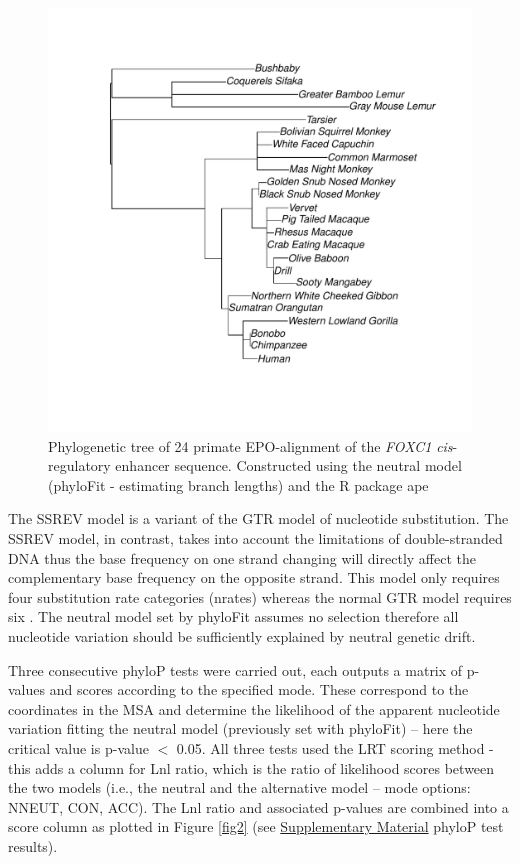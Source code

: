\documentclass{article}[12pt]
\begin{document}
\begin{figure}[H]
\centering
\includegraphics[width=12cm]{neutral_tree.pdf}
\caption{Phylogenetic tree of 24 primate \Gls{EPO}-alignment of the \emph{FOXC1} \emph{cis}-regulatory enhancer sequence. Constructed using the neutral model (phyloFit - estimating branch lengths) and the R package ape \parencite{Ape}}
\label{fig1}
\end{figure}

The \Gls{SSREV} model is a variant of the \Gls{GTR} model of nucleotide substitution. The SSREV model, in contrast, takes into account the limitations of double-stranded DNA thus the base frequency on one strand changing will directly affect the complementary base frequency on the opposite strand. This model only requires four substitution rate categories (nrates) whereas the normal GTR model requires six \parencite{PhyloP, Gittelman2015}. The neutral model set by phyloFit assumes no selection therefore all nucleotide variation should be sufficiently explained by neutral genetic drift.

Three consecutive phyloP tests were carried out, each outputs a matrix of p-values and scores according to the specified mode. These correspond to the coordinates in the MSA and determine the likelihood of the apparent nucleotide variation fitting the neutral model (previously set with phyloFit) – here the critical value is p-value $<$ 0.05. All three tests used the \Gls{LRT} scoring method - this adds a column for Lnl ratio, which is the ratio of likelihood scores between the two models (i.e., the neutral and the alternative model – mode options: NNEUT, CON, ACC). The Lnl ratio and associated p-values are combined into a score column as plotted in Figure \ref{fig2} (see \hyperref[sec:supp]{Supplementary Material} phyloP test results).
\end{document}
